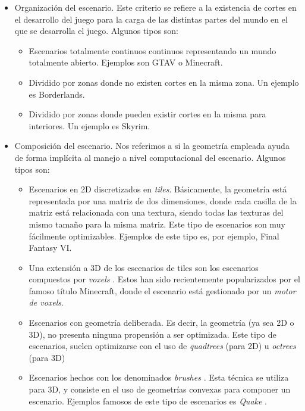 \begin{itemize}
	\item Organización del escenario. Este criterio se refiere a la existencia de cortes en el desarrollo del juego para la carga de las distintas partes del mundo en el que se desarrolla el juego. Algunos tipos son:
	\begin{itemize}
		\item Escenarios totalmente continuos continuos representando un mundo totalmente abierto. Ejemplos son GTAV o Minecraft.
		\item Dividido por zonas donde no existen cortes en la misma zona. Un ejemplo es Borderlands.
		\item Dividido por zonas donde pueden existir cortes en la misma para interiores. Un ejemplo es Skyrim.
	\end{itemize}
	\item Composición del escenario. Nos referimos a si la geometría empleada ayuda de forma implícita al manejo a nivel computacional del escenario. Algunos tipos son:
	\begin{itemize}
		\item Escenarios en 2D discretizados en \emph{tiles}. Básicamente, la geometría está representada por una matriz de dos dimensiones, donde cada casilla de la matriz está relacionada con una textura, siendo todas las texturas del mismo tamaño para la misma matriz. Este tipo de escenarios son muy fácilmente optimizables. Ejemplos de este tipo es, por ejemplo, Final Fantasy VI.
		\item Una extensión a 3D de los escenarios de tiles son los escenarios compuestos por \emph{voxels} \cite{voxel}. Estos han sido recientemente popularizados por el famoso título Minecraft, donde el escenario está gestionado por un \emph{motor de voxels}.
		\item Escenarios con geometría deliberada. Es decir, la geometría (ya sea 2D o 3D), no presenta ninguna propensión a ser optimizada. Este tipo de escenarios, suelen optimizarse con el uso de \emph{quadtrees} \cite{quadtree} (para 2D) u \emph{octrees} \cite{octree} (para 3D)
		\item Escenarios hechos con los denominados \emph{brushes} \cite{brush}. Esta técnica se utiliza para 3D, y consiste en el uso de geometrías convexas para componer un escenario. Ejemplos famosos de este tipo de escenarios es \emph{Quake} \cite{quake}.
	\end{itemize}
\end{itemize}

